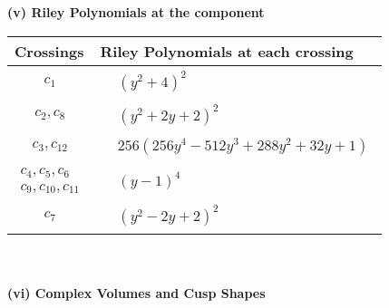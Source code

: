 \documentclass[1p]{elsarticle_modified}
\theoremstyle{definition}
\begin{document}
\newpage\renewcommand{\arraystretch}{1}
\flushleft \textbf{(v) Riley Polynomials at the component}\newline \\
\begin{tabular}{m{50pt}|m{274pt}}
Crossings & \hspace{64pt}Riley Polynomials at each crossing \\
\hline $$\begin{aligned}c_{1}\end{aligned}$$&$\begin{aligned}
&(y^2+4)^2
\end{aligned}$\\
\hline $$\begin{aligned}c_{2},c_{8}\end{aligned}$$&$\begin{aligned}
&(y^2+2 y+2)^2
\end{aligned}$\\
\hline $$\begin{aligned}c_{3},c_{12}\end{aligned}$$&$\begin{aligned}
&256(256 y^4-512 y^3+288 y^2+32 y+1)
\end{aligned}$\\
\hline $$\begin{aligned}c_{4},c_{5},c_{6}\\c_{9},c_{10},c_{11}\end{aligned}$$&$\begin{aligned}
&(y-1)^4
\end{aligned}$\\
\hline $$\begin{aligned}c_{7}\end{aligned}$$&$\begin{aligned}
&(y^2-2 y+2)^2
\end{aligned}$\\
\hline
\end{tabular}\\~\\
\newpage\flushleft \textbf{(vi) Complex Volumes and Cusp Shapes}
\end{document}

